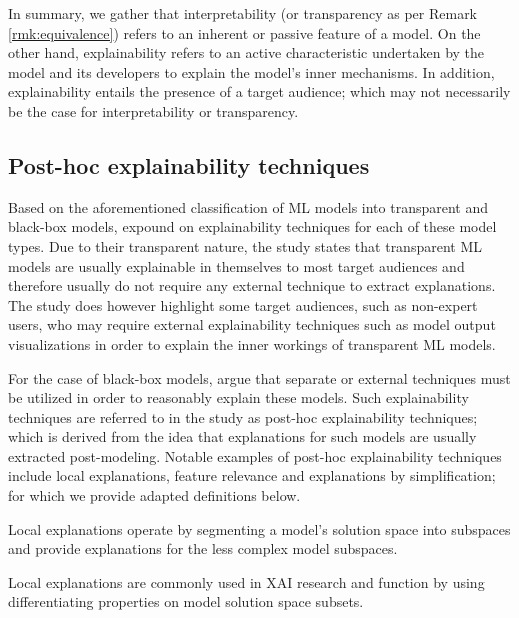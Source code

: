 In summary, we gather that interpretability (or transparency as per Remark
\ref{rmk:equivalence}) refers to an inherent or passive feature of a model. On
the other hand, explainability refers to an active characteristic undertaken by
the model and its developers to explain the model's inner mechanisms. In
addition, explainability entails the presence of a target audience; which may
not necessarily be the case for interpretability or transparency.

\subsection{Post-hoc explainability techniques}

\label{section:xai_techniques}

Based on the aforementioned classification of ML models into transparent and
black-box models, \citet{arrieta2020explainable} expound on explainability
techniques for each of these model types. Due to their transparent nature, the
study states that transparent ML models are usually explainable in themselves to
most target audiences and therefore usually do not require any external
technique to extract explanations. The study does however highlight some target
audiences, such as non-expert users, who may require external explainability
techniques such as model output visualizations in order to explain the inner
workings of transparent ML models.

For the case of black-box models, \citet{arrieta2020explainable} argue that
separate or external techniques must be utilized in order to reasonably explain
these models. Such explainability techniques are referred to in the study as
post-hoc explainability techniques; which is derived from the idea that
explanations for such models are usually extracted post-modeling. Notable
examples of post-hoc explainability techniques include local explanations,
feature relevance and explanations by simplification; for which we provide
adapted definitions below.

\begin{definition}
  Local explanations operate by segmenting a model's solution space into
  subspaces and provide explanations for the less complex model subspaces.
\end{definition}

\begin{remark}
  Local explanations are commonly used in XAI research and function by using
  differentiating properties on model solution space subsets.
\end{remark}

